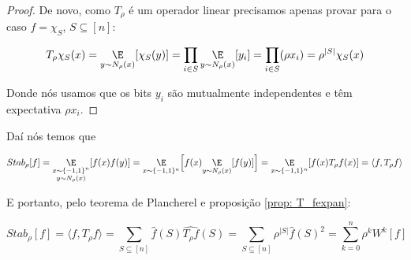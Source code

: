 \begin{proof}

    De novo, como $T_{\rho}$ é um operador linear precisamos apenas provar para o caso $f = \chi_{S}$, $S \subseteq [n]$:

    \begin{equation*}
        T_{\rho}\chi_{S}(x) = \underset{y \sim N_{\rho}(x)}{\E}[\chi_{S}(y)] = \prod_{i \in S}\underset{y \sim N_{\rho}(x)}{\E}[y_{i}] = \prod_{i \in S}(\rho x_{i}) = \rho^{\lvert S \rvert}\chi_{S}(x)
    \end{equation*}  

    Donde nós usamos que os bits $y_{i}$ são mutualmente independentes e têm expectativa $\rho x_{i}$.  

\end{proof}

Daí nós temos que

\begin{equation*}
    Stab_{\rho}[f] = \underset{\substack{x \sim \pmonen \\ y \sim N_{\rho}(x)}}{\E}[f(x)f(y)] = \underset{x \sim \pmonen }{\E}\Big[f(x)\underset{y \sim N_{\rho}(x)}{\E}[f(y)]\Big] = \underset{x \sim \pmonen}{\E}[f(x)T_{\rho}f(x)] = \langle f, T_{\rho}f \rangle
\end{equation*}

E portanto, pelo teorema de Plancherel e proposição \ref{prop: T_fexpan}:

\begin{equation} \label{fourier_stab}
    Stab_{\rho}[f] = \langle f, T_{\rho}f \rangle = \sum_{S \subseteq [n]} \widehat{f}(S) \widehat{T_{\rho}f}(S)
                                                  = \sum_{S \subseteq [n]} \rho^{\lvert S \rvert} \widehat{f}(S)^{2}
                                                  = \sum_{k = 0}^{n} \rho^{k} W^{k}[f]
\end{equation}





